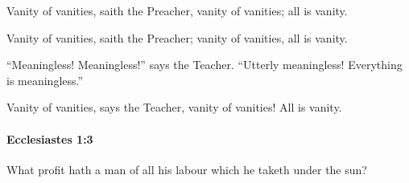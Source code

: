 			Vanity of vanities, saith the Preacher, vanity of vanities; all is vanity.

			\begin{versebox}
					\item[BHS] 
					\item[LXX] 
					\item[ASV] Vanity of vanities, saith the Preacher; vanity of vanities, all is vanity.
					\item[NIV] “Meaningless! Meaningless!” says the Teacher. “Utterly meaningless! Everything is meaningless.”
					\item[NRSV] Vanity of vanities, says the Teacher, vanity of vanities! All is vanity.
			\end{versebox}

		\paragraph{Ecclesiastes 1:3} %
			\label{ECCLESIASTES-1-3}

			What profit hath a man of all his labour which he taketh under the sun?

